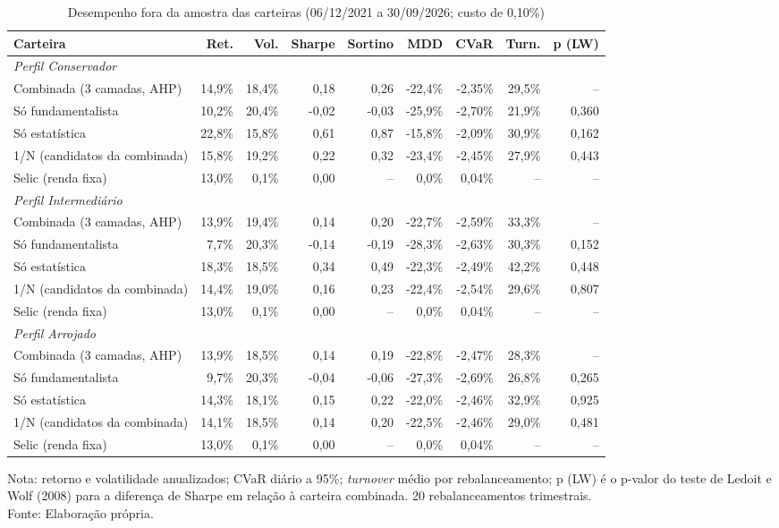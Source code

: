 \begin{table}[htbp]
\centering
\caption{Desempenho fora da amostra das carteiras (06/12/2021 a 30/09/2026; custo de 0,10\%)}
\label{tab:resultado-backtest}
\footnotesize
\begin{tabular}{lrrrrrrrr}
\toprule
\textbf{Carteira} & \textbf{Ret.} & \textbf{Vol.} & \textbf{Sharpe} & \textbf{Sortino} & \textbf{MDD} & \textbf{CVaR} & \textbf{Turn.} & \textbf{p (LW)} \\
\midrule
\multicolumn{9}{l}{\textit{Perfil Conservador}} \\
Combinada (3 camadas, AHP) & 14,9\% & 18,4\% & 0,18 & 0,26 & -22,4\% & -2,35\% & 29,5\% & -- \\
Só fundamentalista & 10,2\% & 20,4\% & -0,02 & -0,03 & -25,9\% & -2,70\% & 21,9\% & 0,360 \\
Só estatística & 22,8\% & 15,8\% & 0,61 & 0,87 & -15,8\% & -2,09\% & 30,9\% & 0,162 \\
1/N (candidatos da combinada) & 15,8\% & 19,2\% & 0,22 & 0,32 & -23,4\% & -2,45\% & 27,9\% & 0,443 \\
Selic (renda fixa) & 13,0\% & 0,1\% & 0,00 & -- & 0,0\% & 0,04\% & -- & -- \\
\midrule
\multicolumn{9}{l}{\textit{Perfil Intermediário}} \\
Combinada (3 camadas, AHP) & 13,9\% & 19,4\% & 0,14 & 0,20 & -22,7\% & -2,59\% & 33,3\% & -- \\
Só fundamentalista & 7,7\% & 20,3\% & -0,14 & -0,19 & -28,3\% & -2,63\% & 30,3\% & 0,152 \\
Só estatística & 18,3\% & 18,5\% & 0,34 & 0,49 & -22,3\% & -2,49\% & 42,2\% & 0,448 \\
1/N (candidatos da combinada) & 14,4\% & 19,0\% & 0,16 & 0,23 & -22,4\% & -2,54\% & 29,6\% & 0,807 \\
Selic (renda fixa) & 13,0\% & 0,1\% & 0,00 & -- & 0,0\% & 0,04\% & -- & -- \\
\midrule
\multicolumn{9}{l}{\textit{Perfil Arrojado}} \\
Combinada (3 camadas, AHP) & 13,9\% & 18,5\% & 0,14 & 0,19 & -22,8\% & -2,47\% & 28,3\% & -- \\
Só fundamentalista & 9,7\% & 20,3\% & -0,04 & -0,06 & -27,3\% & -2,69\% & 26,8\% & 0,265 \\
Só estatística & 14,3\% & 18,1\% & 0,15 & 0,22 & -22,0\% & -2,46\% & 32,9\% & 0,925 \\
1/N (candidatos da combinada) & 14,1\% & 18,5\% & 0,14 & 0,20 & -22,5\% & -2,46\% & 29,0\% & 0,481 \\
Selic (renda fixa) & 13,0\% & 0,1\% & 0,00 & -- & 0,0\% & 0,04\% & -- & -- \\
\bottomrule
\end{tabular}

\vspace{0.2cm}
\small Nota: retorno e volatilidade anualizados; CVaR diário a 95\%; \textit{turnover} médio por rebalanceamento; p (LW) é o p-valor do teste de Ledoit e Wolf (2008) para a diferença de Sharpe em relação à carteira combinada. 20 rebalanceamentos trimestrais.\\
Fonte: Elaboração própria.
\end{table}
